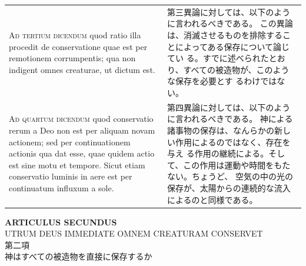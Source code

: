 \documentclass[paper=a4paper,fontsize=10pt,jafontsize=9pt,titlepage]{jlreq}
\begin{document}
\begin{longtable}{p{21em}p{21em}}
\\


{\scshape Ad tertium dicendum} quod ratio illa procedit
de conservatione quae est per remotionem corrumpentis; qua non indigent
omnes creaturae, ut dictum est.

&

第三異論に対しては、以下のように言われるべきである。
この異論は、消滅させるものを排除することによってある保存について論じてい
 る。すでに述べられたとおり、すべての被造物が、このような保存を必要とす
 るわけではない。

\\


{\scshape Ad quartum dicendum} quod conservatio rerum a
Deo non est per aliquam novam actionem; sed per continuationem actionis
qua dat esse, quae quidem actio est sine motu et tempore. Sicut etiam
conservatio luminis in aere est per continuatum influxum a sole.

&

第四異論に対しては、以下のように言われるべきである。
神による諸事物の保存は、なんらかの新しい作用によるのではなく、存在を与え
 る作用の継続による。そして、この作用は運動や時間をもたない。ちょうど、
 空気の中の光の保存が、太陽からの連続的な流入によるのと同様である。


\end{longtable}
\newpage

\begin{center}
 {\Large {\bfseries ARTICULUS SECUNDUS}}\\
 {\large UTRUM DEUS IMMEDIATE OMNEM CREATURAM CONSERVET}\\
 {\Large 第二項\\神はすべての被造物を直接に保存するか}
\end{center}
\end{document}

